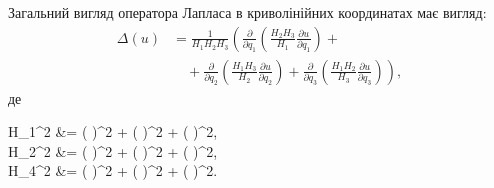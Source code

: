 Загальний вигляд оператора Лапласа в криволінійних координатах має вигляд:
\begin{equation}
	\begin{aligned}
		\Delta(u) &= \frac{1}{H_1H_2H_3} \left( \frac{\partial}{\partial q_1} \left( \frac{H_2H_3}{H_1} \frac{\partial u}{\partial q_1} \right) \right. + \\
		&\quad + \left. \frac{\partial}{\partial q_2} \left( \frac{H_1H_3}{H_2} \frac{\partial u}{\partial q_2} \right) + \frac{\partial}{\partial q_3} \left( \frac{H_1H_2}{H_3} \frac{\partial u}{\partial q_3} \right) \right),
	\end{aligned}
\end{equation}
де
\begin{system}
	\label{eq:4.5.18}
	H_1^2 &= \left(  \right)^2 + \left(  \right)^2 + \left(  \right)^2, \\
	H_2^2 &= \left(  \right)^2 + \left(  \right)^2 + \left(  \right)^2, \\
	H_4^2 &= \left(  \right)^2 + \left(  \right)^2 + \left(  \right)^2.
\end{system}

